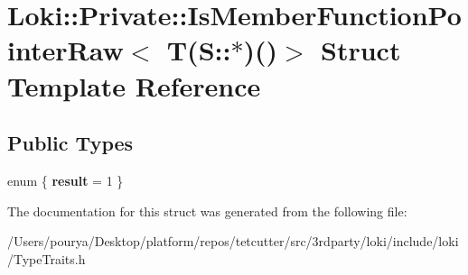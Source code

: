 \hypertarget{structLoki_1_1Private_1_1IsMemberFunctionPointerRaw_3_01T_07S_1_1_5_08_07_08_4}{}\section{Loki\+:\+:Private\+:\+:Is\+Member\+Function\+Pointer\+Raw$<$ T(S\+:\+:$\ast$)()$>$ Struct Template Reference}
\label{structLoki_1_1Private_1_1IsMemberFunctionPointerRaw_3_01T_07S_1_1_5_08_07_08_4}
\subsection*{Public Types}
\begin{DoxyCompactItemize}
\item 
\hypertarget{structLoki_1_1Private_1_1IsMemberFunctionPointerRaw_3_01T_07S_1_1_5_08_07_08_4_ac4a5905c3b8314a8be1919fe691f7b22}{}enum \{ {\bfseries result} = 1
 \}\label{structLoki_1_1Private_1_1IsMemberFunctionPointerRaw_3_01T_07S_1_1_5_08_07_08_4_ac4a5905c3b8314a8be1919fe691f7b22}

\end{DoxyCompactItemize}


The documentation for this struct was generated from the following file\+:\begin{DoxyCompactItemize}
\item 
/\+Users/pourya/\+Desktop/platform/repos/tetcutter/src/3rdparty/loki/include/loki/Type\+Traits.\+h\end{DoxyCompactItemize}
